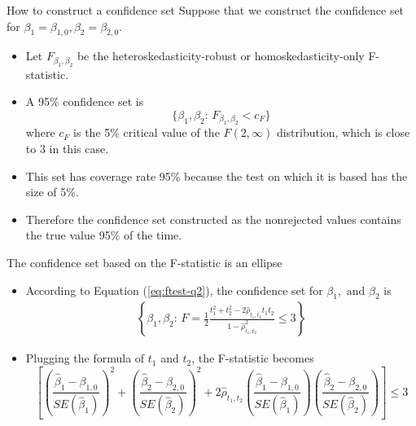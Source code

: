 \documentclass[presentation,10pt]{beamer}
\begin{document}
\begin{frame}[label={sec:orgf822f7f}]{How to construct a confidence set}
Suppose that we construct the confidence set for \(\beta_1 =
\beta_{1,0}, \beta_2 = \beta_{2,0}\).

\begin{itemize}
\item Let \(F_{\beta_1, \beta_2}\) be the heteroskedasticity-robust or
homoskedasticity-only F-statistic.

\item A 95\% confidence set is
\[\{\beta_1, \beta_2:\, F_{\beta_1,\beta_2} < c_F\}\]
where \(c_F\) is the 5\% critical value of the \(F(2, \infty)\)
distribution, which is close to 3 in this case.

\item This set has coverage rate 95\% because the test on which it is based
has the size of 5\%.

\item Therefore the confidence set constructed as the nonrejected values
contains the true value 95\% of the time.
\end{itemize}
\end{frame}

\begin{frame}[label={sec:org979438c}]{The confidence set based on the F-statistic is an ellipse}
\begin{itemize}
\item According to Equation (\ref{eq:ftest-q2}), the confidence set for \(\beta_1, \text{ and } \beta_2\) is
\begin{gather*}
\left\{ \beta_1, \beta_2:\, F = \frac{1}{2}\frac{t^2_1 + t^2_2 - 2 \hat{\rho}_{t_1,t_2}t_1t_2}{1 - \hat{\rho}_{t_1,t_2}^2} \leq 3 \right\}
\end{gather*}

\item Plugging the formula of \(t_1\) and \(t_2\), the F-statistic becomes
\begin{equation*}
\left[ \left(\frac{\hat{\beta}_1 - \beta_{1,0}}{SE(\hat{\beta}_1)}\right)^2 + \left(\frac{\hat{\beta}_2 - \beta_{2,0}}{SE(\hat{\beta}_2)}\right)^2 + 2 \hat{\rho}_{t_1,t_2}\left(\frac{\hat{\beta}_1 - \beta_{1,0}}{SE(\hat{\beta}_1)}\right) \left(\frac{\hat{\beta}_2 - \beta_{2,0}}{SE(\hat{\beta}_2)}\right) \right] \leq 3
\end{equation*}
\end{itemize}
\end{frame}
\end{document}
